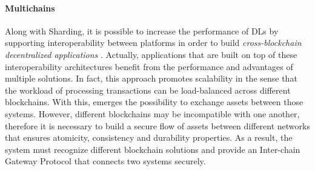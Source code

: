 
\paragraph{Multichains}

Along with Sharding, it is possible to increase the performance of \gls{DL}s by supporting interoperability between platforms in order to build \textit{cross-blockchain decentralized applications} \cite{survey_blockchain_interop}. Actually, applications that are built on top of these interoperability architectures benefit from the performance and advantages of multiple solutions. In fact, this approach promotes scalability in the sense that the workload of processing transactions can be load-balanced across different blockchains. With this, emerges the possibility to exchange assets between those systems. However, different blockchains may be incompatible with one another, therefore it is necessary to build a secure flow of assets between different networks that ensures atomicity, consistency and durability properties. As a result, the system must recognize different blockchain solutions and provide an Inter-chain Gateway Protocol that connects two systems securely. 



